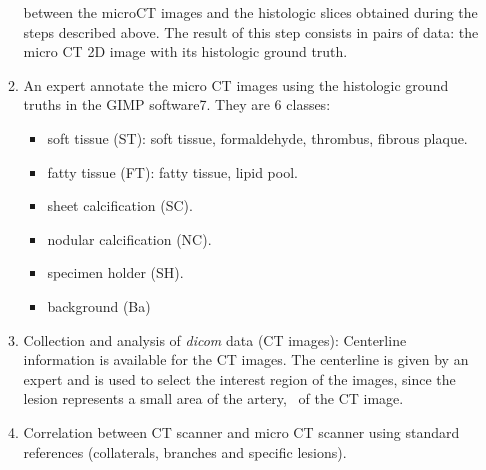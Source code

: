 \begin{itemize}
\begin{enumerate}
        between the microCT images and the histologic slices obtained 
        during the steps described above.
        The result of this step consists in pairs of data: the
        micro CT 2D image with its histologic ground truth. \label{item:co_registration}
        \item  An expert annotate the micro CT images using the histologic 
        ground truths in the GIMP software7. \label{item:annotation}
        They are 6 classes: 
        \begin{itemize}
            \item  soft tissue (ST): soft tissue, formaldehyde, thrombus, fibrous
            plaque.
        	\item fatty tissue (FT): fatty tissue, lipid pool.
        	\item sheet calcification (SC).
        	\item nodular calcification (NC).
        	\item specimen holder (SH).
        	\item background (Ba)
        \end{itemize}
        \item Collection and analysis of \textit{dicom} data (CT images): 
        Centerline information is available for the CT images.
        The centerline is given by an expert and is used to select the interest region
        of the images, since the lesion represents a small area of the artery,
        \ie~of the CT image. 
        \label{item:correlation_ct}
        \item Correlation between  CT scanner  and micro CT scanner  using standard
        references (collaterals, branches and specific lesions).\label{item:correlation}
    \end{enumerate}
\end{itemize}



